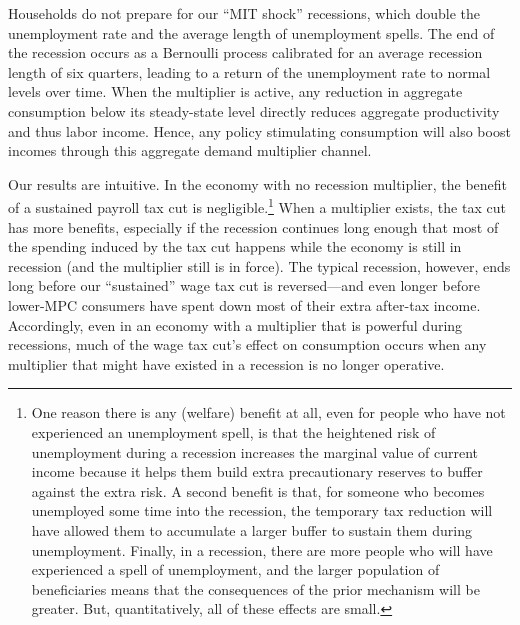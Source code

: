 \documentclass[\econtexRoot/HAFiscal]{subfiles}
\begin{document}
Households do not prepare for our ``MIT shock'' recessions, which double the unemployment rate and the average length of unemployment spells. The end of the recession occurs as a Bernoulli process calibrated for an average recession length of six quarters, leading to a return of the unemployment rate to normal levels over time. When the multiplier is active, any reduction in aggregate consumption below its steady-state level directly reduces aggregate productivity and thus labor income. Hence, any policy stimulating consumption will also boost incomes through this aggregate demand multiplier channel.


Our results are intuitive.  In the economy with no recession multiplier, the benefit of a sustained payroll tax cut is negligible.\footnote{One reason there is any (welfare) benefit at all, even for people who have not experienced an unemployment spell, is that the heightened risk of unemployment during a recession increases the marginal value of current income because it helps them build extra precautionary reserves to buffer against the extra risk.  A second benefit is that, for someone who becomes unemployed some time into the recession, the temporary tax reduction will have allowed them to accumulate a larger buffer to sustain them during unemployment.  Finally, in a recession, there are more people who will have experienced a spell of unemployment, and the larger population of beneficiaries means that the consequences of the prior mechanism will be greater.  But, quantitatively, all of these effects are small.}
When a multiplier exists, the tax cut has more benefits, especially if the recession continues long enough that most of the spending induced by the tax cut happens while the economy is still in recession (and the multiplier still is in force).  The typical recession, however, ends long before our ``sustained'' wage tax cut is reversed---and even longer before lower-MPC consumers have spent down most of their extra after-tax income. Accordingly, even in an economy with a multiplier that is powerful during recessions, much of the wage tax cut's effect on consumption occurs when any multiplier that might have existed in a recession is no longer operative.
\end{document}

